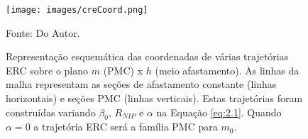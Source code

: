 \begin{figure}[htb]
\caption{Representação esquemática das coordenadas de várias trajetórias ERC sobre o plano $m$ (PMC) x $h$ (meio afastamento).
As linhas da malha representam as seções de afastamento constante (linhas horizontais) e seções PMC (linhas verticais).
Estas trajetórias foram construídas variando $\beta_0$, $R_{NIP}$ e $\alpha$  na Equação \ref{eq:2.1}. Quando
$\alpha=0$ a trajetória ERC será a família PMC para $m_0$.}
\begin{center}
\texttt{[image: images/creCoord.png]}
\vspace{-0.3cm}
\end{center}
\begin{center}
 Fonte: Do Autor.
\end{center}
\label{fig:2.2}
\end{figure}

